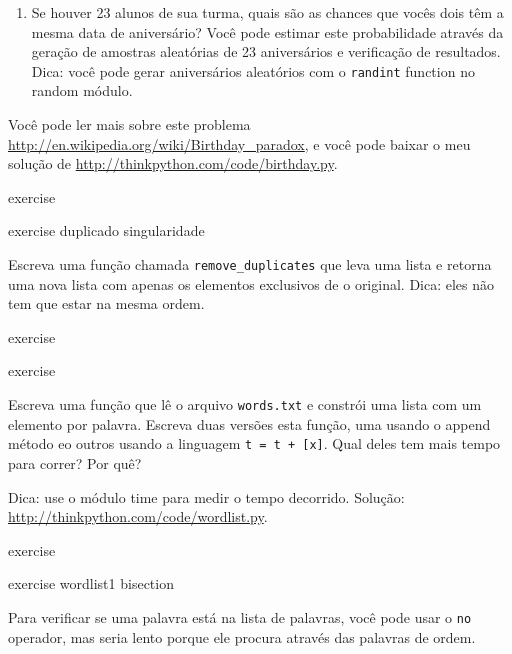 \documentclass[10pt]{book}
\begin{document}
\begin{exercise}
\begin{}
\begin{enumerate}
\item Se houver 23 alunos de sua turma, quais são as chances
que vocês dois têm a mesma data de aniversário? Você pode estimar este
probabilidade através da geração de amostras aleatórias de 23 aniversários
e verificação de resultados. Dica: você pode gerar aniversários aleatórios
com o {\tt randint} function no {random \tt} módulo.

\end{enumerate}

Você pode ler mais sobre este problema
\url{http://en.wikipedia.org/wiki/Birthday_paradox}, e você pode baixar o meu
solução de \url{http://thinkpython.com/code/birthday.py}.

\end{} exercise


\begin{} exercise
\index{} duplicado
\index{} singularidade

Escreva uma função chamada \verb "remove_duplicates" que leva
uma lista e retorna uma nova lista com apenas os elementos exclusivos de
o original. Dica: eles não tem que estar na mesma ordem.
\end{} exercise


\begin{} exercise

Escreva uma função que lê o arquivo {\tt words.txt} e constrói
uma lista com um elemento por palavra. Escreva duas versões
esta função, uma usando o {\tt} append método eo
outros usando a linguagem {\tt t = t + [x]}. Qual deles tem
mais tempo para correr? Por quê?

Dica: use o módulo {time \tt} para medir o tempo decorrido.
Solução: \url{http://thinkpython.com/code/wordlist.py}.

\end{} exercise


\begin{} exercise
\label{} wordlist1
\label{} bisection

Para verificar se uma palavra está na lista de palavras, você pode usar
o {\tt no} operador, mas seria lento porque ele procura
através das palavras de ordem.


\end{}
\end{exercise}
\end{document}
